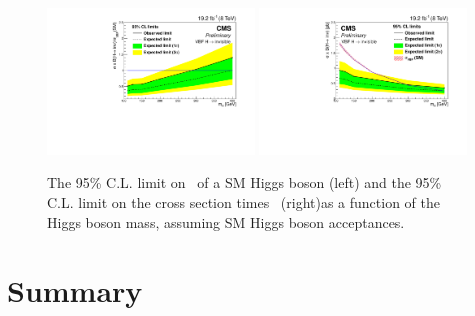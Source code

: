\begin{figure}[h!]
  \begin{center}
    \includegraphics[width=0.49\textwidth]{Chapter07/Images/vbflimit.pdf} %
    \includegraphics[width=0.49\textwidth]{Chapter07/Images/vbfxslimit.pdf}
 \caption{The 95\% C.L. limit on \BRinv\, of a SM Higgs
boson (left) and the 95\% C.L. limit on the cross section times
\BRinv\, (right)as a function of the Higgs
boson mass, assuming SM Higgs boson acceptances. \cite{ARTICLE:CMSVBFHiggsInvisibleParkedAnalysisPAS}}
    \label{fig:limits}
  \end{center}
\end{figure}


\section{Summary}
\label{SECTION:ParkedDataAnalysis_Summary}



% 
% 

